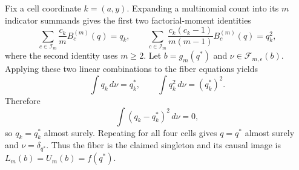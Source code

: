 Fix a cell coordinate \(k=(a,y)\).  Expanding a multinomial count into its \(m\) indicator summands gives the first two factorial-moment identities
\[
 \sum_{c\in\mathcal I_m}\frac{c_k}{m}B_c^{(m)}(q)=q_k,
 \qquad
 \sum_{c\in\mathcal I_m}\frac{c_k(c_k-1)}{m(m-1)}B_c^{(m)}(q)=q_k^2,
\]
where the second identity uses \(m\geq2\).  Let \(b=g_m(q^*)\) and \(\nu\in\mathcal F_{m,\epsilon}(b)\).  Applying these two linear combinations to the fiber equations yields
\[
 \int q_k\,d\nu=q_k^*,
 \qquad
 \int q_k^2\,d\nu=(q_k^*)^2.
\]
Therefore
\[
 \int(q_k-q_k^*)^2\,d\nu=0,
\]
so \(q_k=q_k^*\) almost surely.  Repeating for all four cells gives \(q=q^*\) almost surely and \(\nu=\delta_{q^*}\).  Thus the fiber is the claimed singleton and its causal image is \(L_m(b)=U_m(b)=f(q^*)\).